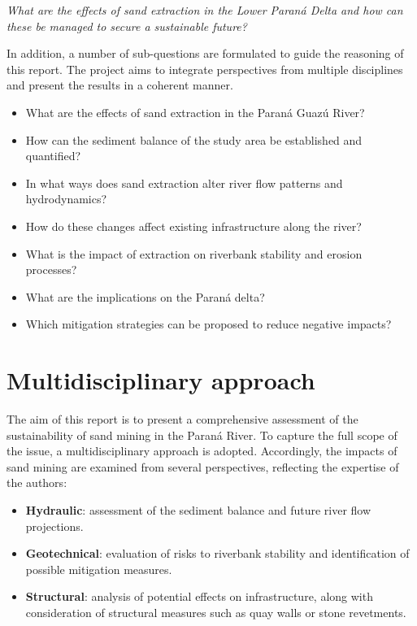 \textit{What are the effects of sand extraction in the Lower Paraná
Delta and how can these be managed to secure a sustainable future?}

In addition, a number of sub-questions are formulated to guide the reasoning of this report. The project aims to integrate perspectives from multiple disciplines and present the results in a coherent manner.

\begin{itemize} 
    \item What are the effects of sand extraction in the Paraná Guazú River?
    \item How can the sediment balance of the study area be established and quantified?
    \item In what ways does sand extraction alter river flow patterns and hydrodynamics?
    \item How do these changes affect existing infrastructure along the river?
    \item What is the impact of extraction on riverbank stability and erosion processes?
    \item What are the implications on the Paraná delta?
    \item Which mitigation strategies can be proposed to reduce negative impacts?
\end{itemize}

\section{Multidisciplinary approach}
The aim of this report is to present a comprehensive assessment of the sustainability of sand mining in the Paraná River. To capture the full scope of the issue, a multidisciplinary approach is adopted. Accordingly, the impacts of sand mining are examined from several perspectives, reflecting the expertise of the authors:

\begin{itemize}
    \item \textbf{Hydraulic}: assessment of the sediment balance and future river flow projections.
    \item \textbf{Geotechnical}: evaluation of risks to riverbank stability and identification of possible mitigation measures.
    \item \textbf{Structural}: analysis of potential effects on infrastructure, along with consideration of structural measures such as quay walls or stone revetments.
\end{itemize}

